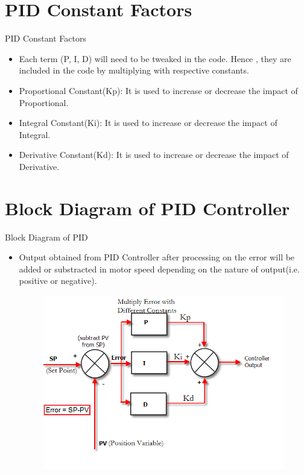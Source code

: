 \documentclass[10pt, a4paper]{beamer}
\begin{document}
	\section{PID Constant Factors}
	\begin{frame}{PID Constant Factors}
		\begin{itemize}
			\item Each term (P, I, D) will need to be tweaked in the code. Hence , they are included in the code by multiplying with respective constants.
			\item Proportional Constant(Kp): It is used to increase or decrease the impact of Proportional.
			\item Integral Constant(Ki): It is used to increase or decrease the impact of Integral.
			\item Derivative Constant(Kd): It is used to increase or decrease the impact of Derivative.
		\end{itemize}
	\end{frame}
	
	\section{Block Diagram of PID Controller}
		\begin{frame}{Block Diagram of PID}
			\begin{itemize}
			 \item Output obtained from PID Controller after processing on the error will be added or substracted in motor speed depending on the nature of output(i.e. positive or negative).
				\begin{figure}
				\centering
				\includegraphics[scale = 0.5]{pid_simplified.png}
				\end{figure}
			\end{itemize}
		\end{frame}
	
\end{document}
